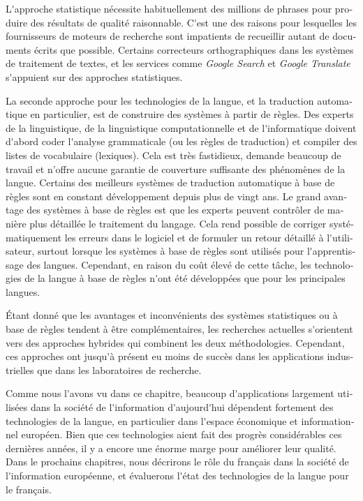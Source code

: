 \begin{french}
\begin{multicols}{2}
L{\mbox '}approche statistique nécessite habituellement des millions
de phrases pour produire des résultats de qualité raisonnable. C{\mbox
 '}est une des raisons pour lesquelles les fournisseurs de moteurs de
recherche sont impatients de recueillir autant de documents écrits que
possible. Certains correcteurs orthographiques dans les systèmes de
traitement de textes, et les services comme {\it Google Search} et
{\it Google Translate} s{\mbox '}appuient sur des approches
statistiques.

La seconde approche pour les technologies de la langue, et la
traduction automatique en particulier, est de construire des systèmes
à partir de règles. Des experts de la linguistique, de la linguistique
computationnelle et de l{\mbox '}informatique doivent d{\mbox '}abord
coder l{\mbox '}analyse grammaticale (ou les règles de traduction) et
compiler des listes de vocabulaire (lexiques). Cela est très
fastidieux, demande beaucoup de travail et n'offre aucune garantie de
couverture suffisante des phénomènes de la langue. Certains des
meilleurs systèmes de traduction automatique à base de règles sont en
constant développement depuis plus de vingt ans. Le grand avantage des
systèmes à base de règles est que les experts peuvent contrôler de
manière plus détaillée le traitement du langage. Cela rend possible de
corriger systématiquement les erreurs dans le logiciel et de formuler
un retour détaillé à l{\mbox '}utilisateur, surtout lorsque les
systèmes à base de règles sont utilisés pour l{\mbox '}apprentissage
des langues. Cependant, en raison du coût élevé de cette tâche, les
technologies de la langue à base de règles n{\mbox '}ont été
développées que pour les principales langues.


Étant donné que les avantages et inconvénients des systèmes
statistiques ou à base de règles tendent à être complémentaires, les
recherches actuelles s{\mbox '}orientent vers des approches hybrides qui
combinent les deux méthodologies. Cependant, ces approches ont jusqu{\mbox '}à
présent eu moins de succès dans les applications industrielles que
dans les laboratoires de recherche.

Comme nous l{\mbox '}avons vu dans ce chapitre, beaucoup d{\mbox '}applications
largement utilisées dans la société de l{\mbox '}information d{\mbox '}aujourd{\mbox '}hui
dépendent fortement des technologies de la langue, en particulier dans
l{\mbox '}espace économique et informationnel européen. Bien que ces
technologies aient fait des progrès considérables ces dernières
années, il y a encore une énorme marge pour améliorer leur
qualité. Dans le prochains chapitres, nous décrirons le rôle du
français dans la société de l{\mbox '}information européenne, et évaluerons
l{\mbox '}état des technologies de la langue pour le français.
\end{multicols}


\end{french}
